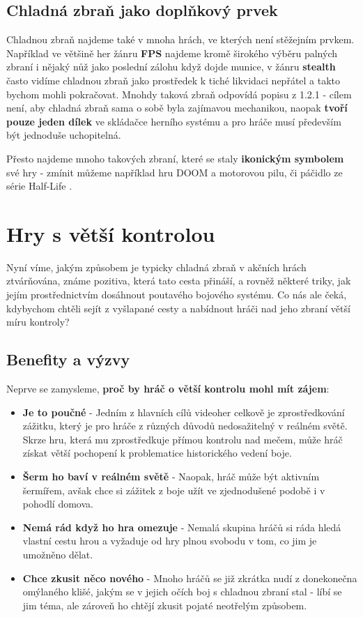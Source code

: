 \subsection{Chladná zbraň jako doplňkový prvek}

Chladnou zbraň najdeme také v mnoha hrách, ve kterých není stěžejním prvkem. Například ve většině her žánru \textbf{\acs{FPS}} najdeme kromě širokého výběru palných zbraní i nějaký nůž jako poslední zálohu když dojde munice, v žánru \textbf{stealth} často vidíme chladnou zbraň jako prostředek k tiché likvidaci nepřátel a takto bychom mohli pokračovat. Mnohdy taková zbraň odpovídá popisu z 1.2.1 - cílem není, aby chladná zbraň sama o sobě byla zajímavou mechanikou, naopak \textbf{tvoří pouze jeden dílek} ve skládačce herního systému a pro hráče musí především být jednoduše uchopitelná. 

Přesto najdeme mnoho takových zbraní, které se staly \textbf{ikonickým symbolem} své hry - zmínit můžeme například hru DOOM \cite{DOOM1993} a motorovou pilu, či páčidlo ze série Half-Life \cite{HalfLife}.


\section{Hry s větší kontrolou}

Nyní víme, jakým způsobem je typicky chladná zbraň v akčních hrách ztvárňována, známe pozitiva, která tato cesta přináší, a rovněž některé triky, jak jejím prostřednictvím dosáhnout poutavého bojového systému. Co nás ale čeká, kdybychom chtěli sejít z vyšlapané cesty a nabídnout hráči nad jeho zbraní větší míru kontroly?

\subsection{Benefity a výzvy}

Neprve se zamysleme, \textbf{proč by hráč o větší kontrolu mohl mít zájem}:
\begin{itemize}
    \item \textbf{Je to poučné} - Jedním z hlavních cílů videoher celkově je zprostředkování zážitku, který je pro hráče z různých důvodů nedosažitelný v reálném světě. Skrze hru, která mu zprostředkuje přímou kontrolu nad mečem, může hráč získat větší pochopení k problematice historického vedení boje.
    \item \textbf{Šerm ho baví v reálném světě} - Naopak, hráč může být aktivním šermířem, avšak chce si zážitek z boje užít ve zjednodušené podobě i v pohodlí domova.
    \item \textbf{Nemá rád když ho hra omezuje} - Nemalá skupina hráčů si ráda hledá vlastní cestu hrou a vyžaduje od hry plnou svobodu v tom, co jim je umožněno dělat. 
    \item \textbf{Chce zkusit něco nového} - Mnoho hráčů se již zkrátka nudí z donekonečna omýlaného klišé, jakým se v jejich očích boj s chladnou zbraní stal - líbí se jim téma, ale zároveň ho chtějí zkusit pojaté neotřelým způsobem.
\end{itemize}

